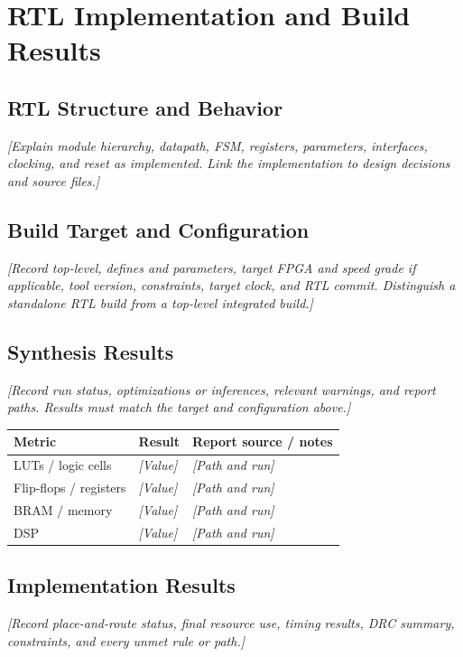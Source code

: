 \chapter{RTL Implementation and Build Results}

\section{RTL Structure and Behavior}
\textit{[Explain module hierarchy, datapath, FSM, registers, parameters, interfaces, clocking, and reset as implemented. Link the implementation to design decisions and source files.]}

\section{Build Target and Configuration}
\textit{[Record top-level, defines and parameters, target FPGA and speed grade if applicable, tool version, constraints, target clock, and RTL commit. Distinguish a standalone RTL build from a top-level integrated build.]}

\section{Synthesis Results}
\textit{[Record run status, optimizations or inferences, relevant warnings, and report paths. Results must match the target and configuration above.]}

\begin{tabularx}{\textwidth}{@{}p{37mm}X X@{}}
  \toprule
  Metric & Result & Report source / notes \\
  \midrule
  LUTs / logic cells & \textit{[Value]} & \textit{[Path and run]} \\
  Flip-flops / registers & \textit{[Value]} & \textit{[Path and run]} \\
  BRAM / memory & \textit{[Value]} & \textit{[Path and run]} \\
  DSP & \textit{[Value]} & \textit{[Path and run]} \\
  \bottomrule
\end{tabularx}

\section{Implementation Results}
\textit{[Record place-and-route status, final resource use, timing results, DRC summary, constraints, and every unmet rule or path.]}

